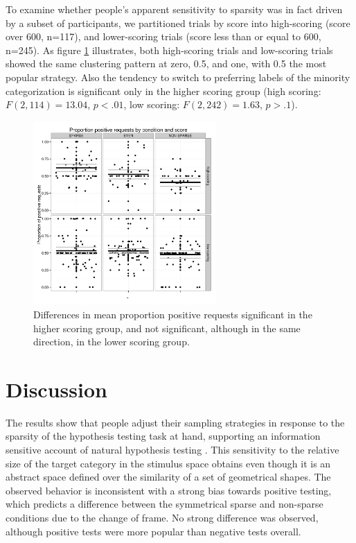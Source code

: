 \documentclass[10pt,letterpaper]{article}
\begin{document}
To examine whether people's apparent sensitivity to sparsity was in fact driven by a subset of participants, we partitioned trials by score into high-scoring (score over 600, n=117), and lower-scoring trials (score less than or equal to 600, n=245). As figure \ref{dotsbyscore} illustrates, both high-scoring trials and low-scoring trials showed the same clustering pattern at zero, 0.5, and one, with 0.5 the most popular strategy. Also the tendency to switch to preferring labels of the minority categorization is significant only in the higher scoring group (high scoring: $F(2,114)=13.04$, $p<.01$, low scoring: $F(2,242)=1.63$, $p>.1$). %

\begin{figure}[t]
\centering
\includegraphics[width=.5\textwidth,height=7cm,keepaspectratio]{dotsbyscore.png}
\caption{Differences in mean proportion positive requests significant in the higher scoring group, and not significant, although in the same direction, in the lower scoring group.}
\label{dotsbyscore}
\end{figure}

\section{Discussion}
The results show that people adjust their sampling strategies in response to the sparsity of the hypothesis testing task at hand, supporting an information sensitive account of natural hypothesis testing \cite{navarro2011sparsecat}. This sensitivity to the relative size of the target category in the stimulus space obtains even though it is an abstract space defined over the similarity of a set of geometrical shapes. The observed behavior is inconsistent with a strong bias towards positive testing, which predicts a difference between the symmetrical {\sc sparse} and {\sc non-sparse} conditions due to the change of frame. No strong difference was observed, although positive tests were more popular than negative tests overall. 
\end{document}
